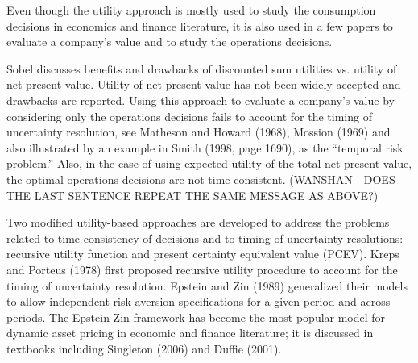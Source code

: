 \documentclass[mnsc,nonblindrev,copyedit]{informs2_wz} %
\newcommand{\OUT}[1]{}
\begin{document}
\OUT{
Assuming stationary condition (that is, if $x$ at time $t$ is preferred over $y$ at time $t + k$, then $x$ at time $s$ is preferred over $y$ at time $s +k$), they show that the utility can be expressed as $U(x,t) = \alpha^t f(x)$, where $1>\alpha>0$ and $f$ is an increasing function.  They also present other forms of utility functions under conditions weaker than the stationarity.  
}
\OUT{
Obviously the discounted utility models satisfy the stationarity condition.  Frederick {\it et al.} \cite{Frederick2002} survey the popularity of theoretical economic analysis based on the discounted utility model, as well as some of its anomalies, pointed out by empirical examples.  They discuss a few minor modifications of the discounted utility model.  The distinctions they draw are that (1) the discount rate as a function of time may be decreasing, and (2) the utility across time may  be interdependent, {\it e.g.}, increasing sequence of payoffs is preferred over decreasing one.
}
Even though the utility approach is mostly used to study the consumption decisions in economics and finance literature, it is also used in a few papers to evaluate a company's value and to study the operations decisions. 
\OUT{
For example, Bouakiz and Sobel \cite{Bouakiz1992} use the expected utility of the total net present value; while this approach does not meet the stationary and separability condition, it meets the continuous and monotonic conditions.
}  
Sobel \cite{Sobel2007} discusses benefits and drawbacks of discounted sum utilities vs. utility of net present value. Utility of net present value has not been widely accepted and drawbacks are reported.  Using this approach to evaluate a company's value by considering only the operations decisions fails to account for the timing of uncertainty resolution, see Matheson and Howard (1968), Mossion (1969) and also illustrated by an example in Smith (1998, page 1690), as the ``temporal risk problem.'' Also, in the case of using expected utility of the total net present value, the optimal operations decisions are not time consistent.
(WANSHAN - DOES THE LAST SENTENCE REPEAT THE SAME MESSAGE AS ABOVE?)


Two modified utility-based approaches are developed to address the problems related to time consistency of decisions and to timing of uncertainty resolutions: recursive utility function and present certainty equivalent value (PCEV). Kreps and Porteus (1978) first proposed recursive utility procedure to account for the timing of uncertainty resolution. Epstein and Zin (1989) generalized their models to allow independent risk-aversion specifications for a given period and across periods. The Epstein-Zin framework has become the most popular model for dynamic asset pricing in economic and finance literature; it is discussed in textbooks including Singleton (2006) and Duffie (2001).  
\end{document}
